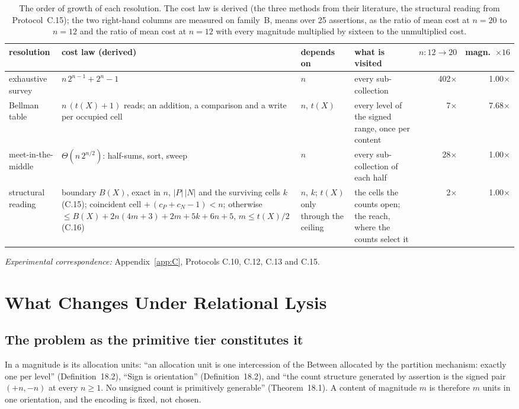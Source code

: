 \documentclass[pdflatex,sn-mathphys-num]{sn-jnl}
\theoremstyle{thmstyleone}%
\theoremstyle{thmstyletwo}%
\theoremstyle{thmstylethree}%
\newcommand{\PA}{\cite{Swanagon2026PA}}
\newcommand{\q}[1]{``#1''}        %
\begin{document}
\begin{table}[!htbp]
\centering
\caption{The order of growth of each resolution. The cost law is derived (the three methods from their literature, the structural reading from Protocol~C.15); the two right-hand columns are measured on family~B, means over 25 assertions, as the ratio of mean cost at $n=20$ to $n=12$ and the ratio of mean cost at $n=12$ with every magnitude multiplied by sixteen to the unmultiplied cost.}
\label{tab:growth}
\small
\setlength{\tabcolsep}{4pt}
\begin{tabular}{l>{\raggedright\arraybackslash}p{}>{\raggedright\arraybackslash}p{}>{\raggedright\arraybackslash}p{}rr}
\toprule
resolution & cost law (derived) & depends on & what is visited & $n{:}12\to20$ & magn.\ $\times16$ \\
\midrule
exhaustive survey & $n\,2^{n-1}+2^n-1$ & $n$ & every sub-collection & 402$\times$ & 1.00$\times$ \\
Bellman table & $n\,(t(X)+1)$ reads; an addition, a comparison and a write per occupied cell & $n$, $t(X)$ & every level of the signed range, once per content & 7$\times$ & 7.68$\times$ \\
meet-in-the-middle & $\Theta(n\,2^{n/2})$: half-sums, sort, sweep & $n$ & every sub-collection of each half & 28$\times$ & 1.00$\times$ \\
structural reading & boundary $B(X)$, exact in $n$, $|P|\,|N|$ and the surviving cells $k$ (C.15); coincident cell $+\,(c_P{+}c_N{-}1)<n$; otherwise $\le B(X)+2n(4m{+}3)+2m+5k+6n+5$, $m\le t(X)/2$ (C.16) & $n$, $k$; $t(X)$ only through the ceiling & the cells the counts open; the reach, where the counts select it & 2$\times$ & 1.00$\times$ \\
\bottomrule
\end{tabular}
\end{table}

\noindent\emph{Experimental correspondence:} Appendix~\ref{app:C}, Protocols C.10, C.12, C.13 and C.15.

\section{What Changes Under Relational Lysis}\label{sec:change}

\subsection{The problem as the primitive tier constitutes it}
In \PA{} a magnitude is its allocation units: \q{an allocation unit is one intercession of the Between allocated by the partition mechanism: exactly one per level} (Definition~18.2), \q{Sign is orientation} (Definition~18.2), and \q{the count structure generated by assertion is the signed pair $(+n, -n)$ at every $n \ge 1$. No unsigned count is primitively generable} (Theorem~18.1). A content of magnitude $m$ is therefore $m$ units in one orientation, and the encoding is fixed, not chosen.
\end{document}
